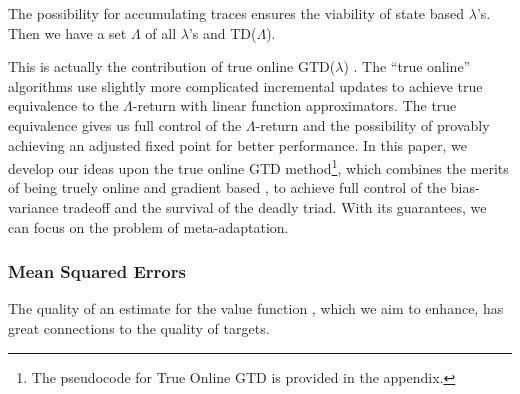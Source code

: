 \documentclass{article}
\begin{document}
The possibility for accumulating traces ensures the viability of state based $\lambda$'s. Then we have a set $\Lambda$ of all $\lambda$'s and TD($\Lambda$).
\par
This is actually the contribution of true online GTD($\lambda$) \cite{hasselt2014true}. The ``true online'' algorithms \cite{seijen2015true} use slightly more complicated incremental updates to achieve true equivalence to the $\Lambda$-return with linear function approximators. The true equivalence gives us full control of the $\Lambda$-return and the possibility of provably achieving an adjusted fixed point for better performance. In this paper, we develop our ideas upon the true online GTD method\footnote{The pseudocode for True Online GTD is provided in the appendix.}, which combines the merits of being truely online and gradient based \cite{hasselt2014true}, to achieve full control of the bias-variance tradeoff and the survival of the deadly triad. With its guarantees, we can focus on the problem of meta-adaptation.
\subsubsection{Mean Squared Errors}
The quality of an estimate for the value function \cite{singh1997analytical}, which we aim to enhance, has great connections to the quality of targets.
\end{document}
